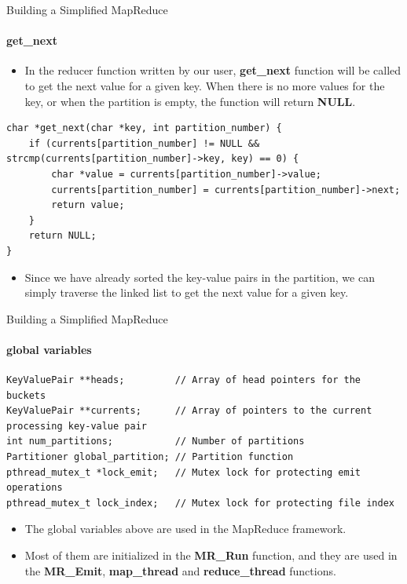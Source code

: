 \documentclass[10pt]{beamer}
\begin{document}
\begin{frame}[fragile]{Building a Simplified MapReduce}
    \framesubtitle{get\_next}
    \begin{itemize}
        \item In the reducer function written by our user, \textbf{get\_next} function will be called to get the next value for a given key. When there is no more values for the key, or when the partition is empty, the function will return \textbf{NULL}.
    \end{itemize}
    \begin{lstlisting}
char *get_next(char *key, int partition_number) {
    if (currents[partition_number] != NULL && strcmp(currents[partition_number]->key, key) == 0) {
        char *value = currents[partition_number]->value;
        currents[partition_number] = currents[partition_number]->next;
        return value;
    }
    return NULL;
}
              \end{lstlisting}
    \begin{itemize}
        \item Since we have already sorted the key-value pairs in the partition, we can simply traverse the linked list to get the next value for a given key.
    \end{itemize}
\end{frame}

\begin{frame}[fragile]{Building a Simplified MapReduce}
    \framesubtitle{global variables}
    \begin{lstlisting}
KeyValuePair **heads;         // Array of head pointers for the buckets
KeyValuePair **currents;      // Array of pointers to the current processing key-value pair
int num_partitions;           // Number of partitions
Partitioner global_partition; // Partition function
pthread_mutex_t *lock_emit;   // Mutex lock for protecting emit operations
pthread_mutex_t lock_index;   // Mutex lock for protecting file index
    \end{lstlisting}
    \begin{itemize}
        \item The global variables above are used in the MapReduce framework.
        \item Most of them are initialized in the \textbf{MR\_Run} function, and they are used in the \textbf{MR\_Emit}, \textbf{map\_thread} and \textbf{reduce\_thread} functions.
    \end{itemize}
\end{frame}
\end{document}
